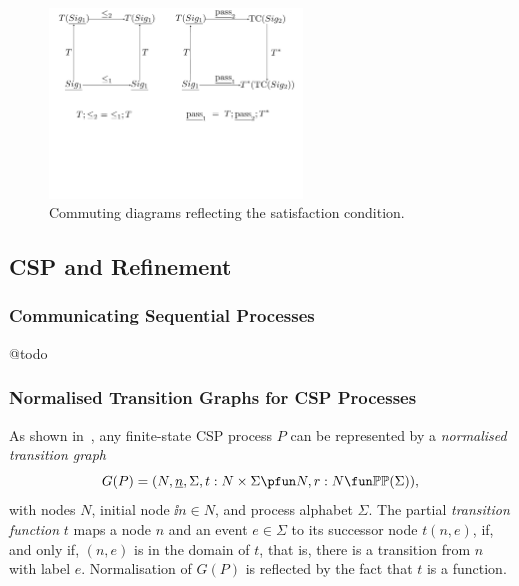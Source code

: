 \begin{figure}
\centering
\includegraphics[width=0.6\textwidth]{satisfaction-condition.pdf}
\vspace*{-20mm}
 \caption{Commuting diagrams reflecting the satisfaction condition.}
 \label{fig:satisfaction-relation}
 \end{figure}

\subsection{CSP and Refinement}


\subsubsection*{Communicating Sequential Processes} @todo

\subsubsection*{Normalised Transition Graphs for CSP Processes}
\label{sec:ntg}

As shown in~\cite{Roscoe:1994:CME:197600}, any finite-state CSP process $P$
can be represented by a \emph{normalised transition graph}
$$
G(P) = ( N, \ii n, \Sigma, t : N\times\Sigma \pfun N, r : N \fun \mathbb{P}\mathbb{P}(\Sigma)),
$$
with nodes $N$, initial node $\ii n\in N$, and process alphabet $\Sigma$. The
partial \emph{transition function} $t$ maps a node $n$ and an event
$e\in\Sigma$ to its successor node $t(n,e)$, if, and only if, $(n,e)$ is in
the domain of $t$, that is, there is a transition from $n$ with label $e$.
Normalisation of $G(P)$ is reflected by the fact that $t$ is a function.

